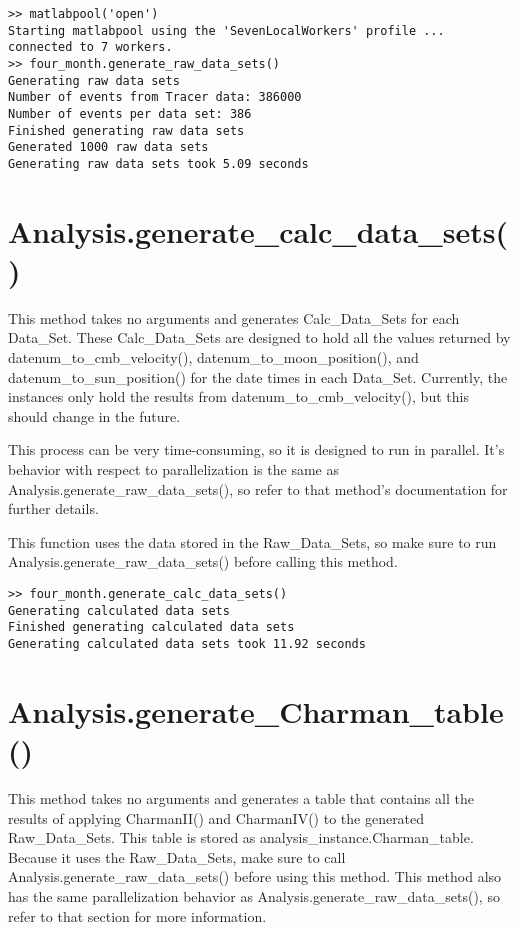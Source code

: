 \documentclass[12pt]{report}
\begin{document}
\begin{verbatim}
>> matlabpool('open')
Starting matlabpool using the 'SevenLocalWorkers' profile ... connected to 7 workers.
>> four_month.generate_raw_data_sets()
Generating raw data sets
Number of events from Tracer data: 386000
Number of events per data set: 386
Finished generating raw data sets
Generated 1000 raw data sets
Generating raw data sets took 5.09 seconds
\end{verbatim}

\section{Analysis.generate\_calc\_data\_sets()}
This method takes no arguments and generates Calc\_Data\_Sets for each Data\_Set.  These Calc\_Data\_Sets are designed to hold all the values returned by datenum\_to\_cmb\_velocity(), datenum\_to\_moon\_position(), and datenum\_to\_sun\_position() for the date times in each Data\_Set.  Currently, the instances only hold the results from datenum\_to\_cmb\_velocity(), but this should change in the future.

This process can be very time-consuming, so it is designed to run in parallel.  It's behavior with respect to parallelization is the same as Analysis.generate\_raw\_data\_sets(), so refer to that method's documentation for further details.

This function uses the data stored in the Raw\_Data\_Sets, so make sure to run Analysis.generate\_raw\_data\_sets() before calling this method.

\begin{verbatim}
>> four_month.generate_calc_data_sets()
Generating calculated data sets
Finished generating calculated data sets
Generating calculated data sets took 11.92 seconds
\end{verbatim}

\section{Analysis.generate\_Charman\_table()}
This method takes no arguments and generates a table that contains all the results of applying CharmanII() and CharmanIV() to the generated Raw\_Data\_Sets.  This table is stored as analysis\_instance.Charman\_table.  Because it uses the Raw\_Data\_Sets, make sure to call Analysis.generate\_raw\_data\_sets() before using this method.  This method also has the same parallelization behavior as Analysis.generate\_raw\_data\_sets(), so refer to that section for more information.
\end{document}
